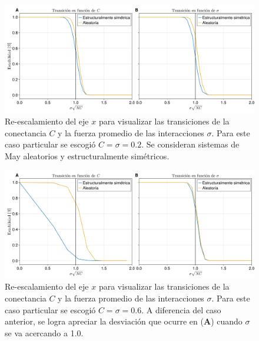 \begin{figure}[h!]
	\centering
	\includegraphics[scale=0.160]{../Imagenes/Transicionσ√NC02}
	\caption{Re-escalamiento del eje $x$ para visualizar las transiciones de la conectancia $C$ y la fuerza promedio de las interacciones $\sigma$. Para este caso particular se escogió $C=\sigma=0.2$. Se consideran sistemas de May aleatorios y estructuralmente simétricos.}
	\label{fig:Transicionσ√NC02}
\end{figure}

\begin{figure}[h!]
	\centering
	\includegraphics[scale=0.160]{../Imagenes/Transicionσ√NC06}
	\caption{Re-escalamiento del eje $x$ para visualizar las transiciones de la conectancia $C$ y la fuerza promedio de las interacciones $\sigma$. Para este caso particular se escogió $C=\sigma=0.6$. A diferencia del  caso anterior, se logra apreciar la desviación que ocurre en (\textbf{A}) cuando $\sigma$ se va acercando a 1.0.}
	\label{fig:Transicionσ√NC06}
\end{figure}






